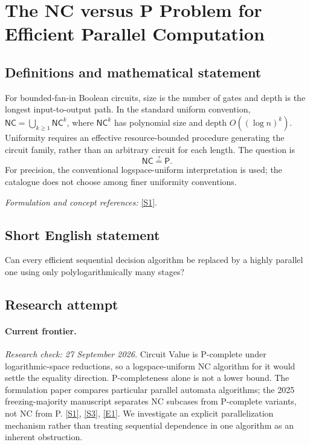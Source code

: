 \documentclass[11pt,a4paper]{article}
\newcommand{\sref}[2]{\hyperlink{source:#1:#2}{[S#2]}}
\newcommand{\eref}[2]{\hyperlink{extra:#1:#2}{[E#2]}}
\newif\ifshowcatalogue
\newcommand{\cataloguescope}[1]{\ifshowcatalogue
 \paragraph{Exact scope in the supplied catalogue.}
 \begin{quote}\small #1\end{quote}\fi}
\begin{document}
\setcounter{section}{0}
\clearpage
\section*{\texorpdfstring{The NC versus P Problem for Efficient Parallel Computation}{The NC versus P Problem for Efficient Parallel Computation}}\label{30006685}
\subsection{Definitions and mathematical statement}
For bounded-fan-in Boolean circuits, size is the number of gates and depth is the longest input-to-output path. In the standard uniform convention, $\mathsf{NC}=\bigcup_{k\ge1}\mathsf{NC}^k$, where $\mathsf{NC}^k$ has polynomial size and depth $O((\log n)^k)$. Uniformity requires an effective resource-bounded procedure generating the circuit family, rather than an arbitrary circuit for each length. The question is
\[
 \mathsf{NC}\stackrel{?}{=}\mathsf P.
\]
For precision, the conventional logspace-uniform interpretation is used; the catalogue does not choose among finer uniformity conventions.
\par\smallskip\textit{Formulation and concept references:} \sref{30006685}{1}.
\cataloguescope{Determine whether NC equals P, where NC consists of decision problems solvable by uniform polynomial-size circuit families of polylogarithmic depth and P consists of decision problems solvable in deterministic polynomial time.}
\subsection{Short English statement}
Can every efficient sequential decision algorithm be replaced by a highly parallel one using only polylogarithmically many stages?
\subsection{Research attempt}
\paragraph{Current frontier.}
\textit{Research check: 27 September 2026.}
Circuit Value is P-complete under logarithmic-space reductions, so a
logspace-uniform NC algorithm for it would settle the equality direction.
P-completeness alone is not a lower bound. The formulation paper compares
particular parallel automata algorithms; the 2025 freezing-majority
manuscript separates NC subcases from P-complete variants, not NC from P.
\sref{30006685}{1}, \sref{30006685}{3}, \eref{30006685}{1}.
We investigate an explicit parallelization mechanism rather than treating
sequential dependence in one algorithm as an inherent obstruction.
\end{document}
